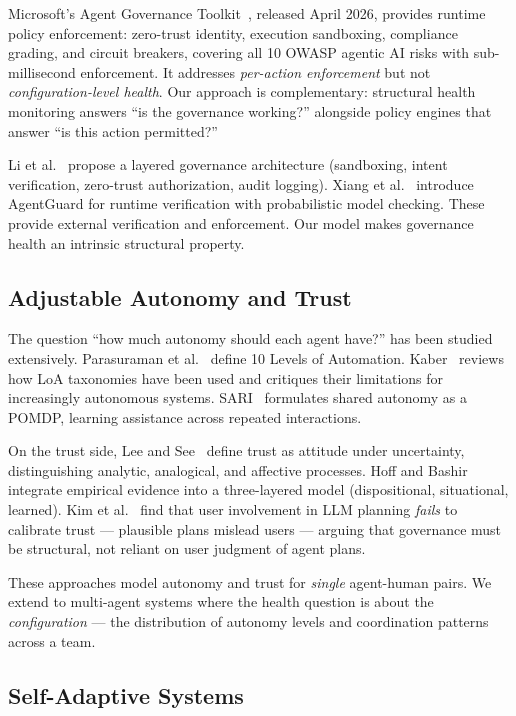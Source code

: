 \documentclass[sigconf,nonacm]{acmart}
\begin{document}
Microsoft's Agent Governance Toolkit~\cite{microsoft}, released April
2026, provides runtime policy enforcement: zero-trust identity, execution
sandboxing, compliance grading, and circuit breakers, covering all 10
OWASP agentic AI risks with sub-millisecond enforcement. It addresses
\emph{per-action enforcement} but not \emph{configuration-level health}.
Our approach is complementary: structural health monitoring answers ``is
the governance working?'' alongside policy engines that answer ``is this
action permitted?''

Li et al.~\cite{liarch} propose a layered governance architecture
(sandboxing, intent verification, zero-trust authorization, audit
logging). Xiang et al.~\cite{agentguard} introduce AgentGuard for
runtime verification with probabilistic model checking. These provide
external verification and enforcement. Our model makes governance health
an intrinsic structural property.

\subsection{Adjustable Autonomy and Trust}

The question ``how much autonomy should each agent have?'' has been
studied extensively. Parasuraman et al.~\cite{parasuraman} define 10
Levels of Automation. Kaber~\cite{kaber} reviews how LoA taxonomies have
been used and critiques their limitations for increasingly autonomous
systems. SARI~\cite{sari} formulates shared autonomy as a POMDP, learning
assistance across repeated interactions.

On the trust side, Lee and See~\cite{leesee} define trust as attitude
under uncertainty, distinguishing analytic, analogical, and affective
processes. Hoff and Bashir~\cite{hoffbashir} integrate empirical evidence
into a three-layered model (dispositional, situational, learned). Kim et
al.~\cite{kim} find that user involvement in LLM planning \emph{fails}
to calibrate trust --- plausible plans mislead users --- arguing that
governance must be structural, not reliant on user judgment of agent plans.

These approaches model autonomy and trust for \emph{single} agent-human
pairs. We extend to multi-agent systems where the health question is
about the \emph{configuration} --- the distribution of autonomy levels
and coordination patterns across a team.

\subsection{Self-Adaptive Systems}
\end{document}
